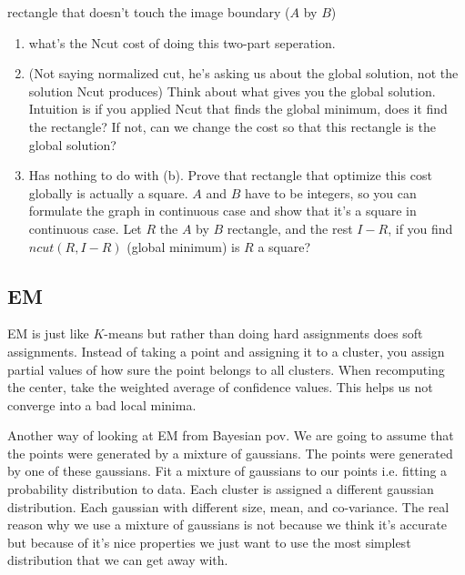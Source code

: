 \begin{enumerate}
  rectangle that doesn't touch the image boundary ($A$ by $B$)
  \begin{enumerate}
  \item what's  the Ncut cost of doing this two-part seperation.
  \item (Not saying normalized cut, he's asking us about the global
    solution, not the solution Ncut produces) Think about what gives
    you the global solution. Intuition is if you applied Ncut that
    finds the global minimum, does it find the rectangle? If not, can
    we change the cost so that this rectangle is the global solution?
  \item Has nothing to do with (b). Prove that rectangle that optimize this cost globally is actually a
    square. $A$ and $B$ have to be integers, so you can formulate the
    graph in continuous case and show that it's a square in continuous
    case. Let $R$ the $A$ by $B$ rectangle, and the rest $I-R$, if you
    find $ncut(R, I-R)$ (global minimum) is $R$ a square?
  \end{enumerate}
\end{enumerate}

\subsection{EM}
\label{sec:EM}
EM is just like $K$-means but rather than doing hard assignments does
soft assignments. Instead of taking a point and assigning it to a
cluster, you assign partial values of how sure the point belongs to
all clusters. When recomputing the center, take the weighted average
of confidence values. This helps us not converge into a bad local
minima.

Another way of looking at EM from Bayesian pov. We are going to assume
that the points were generated by a mixture of gaussians. The points
were generated by one of these gaussians. Fit a mixture of gaussians
to our points i.e. fitting a probability distribution to data. Each
cluster is assigned a different gaussian distribution. Each gaussian
with different size, mean, and co-variance. The real reason
why we use a mixture of gaussians is not because we think it's
accurate but because of it's nice properties we just want to use the
most simplest distribution that we can get away with. 


